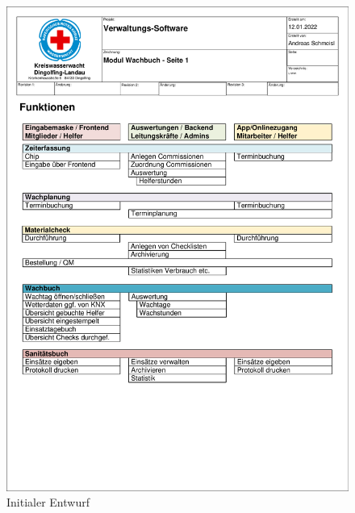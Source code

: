 \documentclass[fontsize=12pt,openright,oneside,paper=a4,BCOR=1cm]{scrbook}
\begin{document}
\begin{appendix}





\begin{figure}[H]
\centering
    \includegraphics[page=3,scale=0.75]{Anlagen/WSM_Software_Modul_Wachbuch.pdf}
  \caption{Initialer Entwurf}
  \label{fig:initial}
\end{figure}


\end{appendix}
\end{document}
